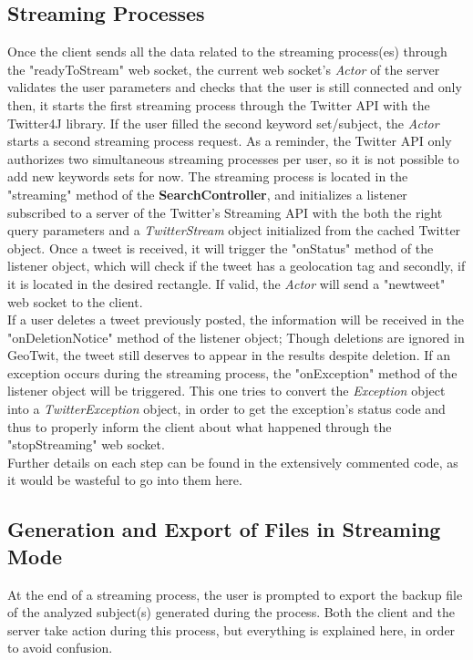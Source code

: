 \documentclass[a4paper,11pt]{report}
\begin{document}
\subsection{Streaming Processes}
Once the client sends all the data related to the streaming process(es) through the "readyToStream" web socket, the current web socket's \emph{Actor} of the server validates the user parameters and checks that the user is still connected and only then, it starts the first streaming process through the Twitter API with the Twitter4J library. If the user filled the second keyword set/subject, the \emph{Actor} starts a second streaming process request. As a reminder, the Twitter API only authorizes two simultaneous streaming processes per user, so it is not possible to add new keywords sets for now. The streaming process is located in the "streaming" method of the \textbf{SearchController}, and initializes a listener subscribed to a server of the Twitter's Streaming API with the both the right query parameters and a \emph{TwitterStream} object initialized from the cached Twitter object. Once a tweet is received, it will trigger the "onStatus" method of the listener object, which will check if the tweet has a geolocation tag and secondly, if it is located in the desired rectangle. If valid, the \emph{Actor} will send a "newtweet" web socket to the client.\\

If a user deletes a tweet previously posted, the information will be received in the "onDeletionNotice" method of the listener object; Though deletions are ignored in GeoTwit, the tweet still deserves to appear in the results despite deletion. If an exception occurs during the streaming process, the "onException" method of the listener object will be triggered. This one tries to convert the \emph{Exception} object into a \emph{TwitterException} object, in order to get the exception's status code and thus to properly inform the client about what happened through the "stopStreaming" web socket.\\

Further details on each step can be found in the extensively commented code, as it would be wasteful to go into them here.

\subsection{Generation and Export of Files in Streaming Mode}
\label{generationOfStreamingFile}
At the end of a streaming process, the user is prompted to export the backup file of the analyzed subject(s) generated during the process. Both the client and the server take action during this process, but everything is explained here, in order to avoid confusion.\\
\end{document}
